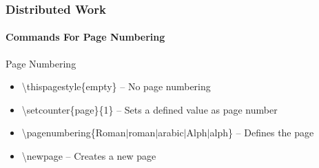 \begin{frame}
\frametitle{Distributed Work}
\framesubtitle{Commands For Page Numbering}
\begin{block}{Page Numbering}
\begin{itemize}
\item \color{nounibaredI}\textbackslash thispagestyle\color{black}\{empty\} -- No page numbering
\item \color{nounibaredI}\textbackslash setcounter\color{black}\{page\}\{1\} -- Sets a defined value as page number
\item \color{nounibaredI}\textbackslash pagenumbering\color{black}\{Roman$\mid$roman$\mid$arabic$\mid$Alph$\mid$alph\} -- Defines the page
\numbering
\item \color{nounibaredI}\textbackslash  newpage \color{black}-- Creates a new page
\end{itemize}
\end{block}
\end{frame}
